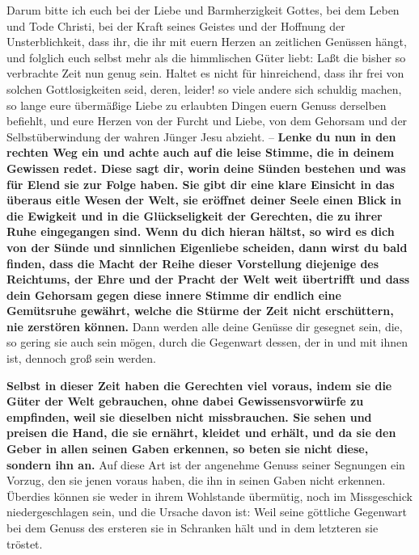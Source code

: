 \label{ref:04_23_innere_stimme}
Darum bitte ich euch bei der Liebe und Barmherzigkeit Gottes, bei dem Leben und
Tode Christi, bei der Kraft seines Geistes und der Hoffnung der Unsterblichkeit,
dass ihr, die ihr mit euern Herzen an zeitlichen Genüssen hängt, und folglich
euch selbst mehr als die himmlischen Güter liebt: Laßt die bisher so
verbrachte Zeit nun genug sein. Haltet es nicht für hinreichend, dass ihr frei
von solchen Gottlosigkeiten seid, deren, leider! so viele andere sich schuldig
machen, so lange eure übermäßige Liebe zu erlaubten Dingen euern Genuss
derselben
befiehlt, und eure Herzen von der Furcht und Liebe, von dem Gehorsam und der
Selbstüberwindung der wahren Jünger Jesu abzieht. -- \textbf{Lenke du nun in den
rechten Weg ein und achte auch auf die leise Stimme, die in deinem Gewissen
redet.
Diese sagt dir, worin deine Sünden bestehen und was für Elend sie zur Folge
haben. Sie gibt dir eine klare Einsicht in das überaus eitle Wesen der Welt,
sie eröffnet deiner Seele einen Blick in die Ewigkeit und in die Glückseligkeit
der Gerechten, die zu ihrer Ruhe eingegangen sind. Wenn du dich hieran hältst,
so wird es dich von der Sünde und sinnlichen Eigenliebe scheiden, dann wirst du
bald finden, dass die Macht der Reihe dieser Vorstellung diejenige des
Reichtums, der Ehre und der Pracht der Welt weit übertrifft und dass dein
Gehorsam gegen diese innere Stimme
dir endlich eine Gemütsruhe gewährt, welche
die Stürme der Zeit nicht erschüttern, nie zerstören können.} Dann werden alle
deine Genüsse dir gesegnet sein, die, so gering sie auch sein mögen, durch die
Gegenwart dessen, der in und mit ihnen ist, dennoch groß sein werden.
\label{ref:04_23_innere_stimme_ende}

\medskip

\label{ref:04_23_dinge_der_welt}
\textbf{Selbst in dieser Zeit haben die Gerechten viel voraus, indem sie die
Güter der
Welt gebrauchen, ohne dabei Gewissensvorwürfe zu empfinden, weil sie dieselben
nicht missbrauchen. Sie sehen und preisen die Hand, die sie ernährt, kleidet und
erhält, und da sie den Geber in allen seinen Gaben erkennen, so beten sie nicht
diese, sondern ihn an.} Auf diese Art ist der angenehme Genuss seiner Segnungen
ein Vorzug, den sie jenen voraus haben, die ihn in seinen Gaben nicht
erkennen. Überdies können sie weder in ihrem Wohlstande übermütig, noch im
Missgeschick niedergeschlagen sein, und die Ursache davon ist: Weil seine
göttliche Gegenwart bei dem Genuss des ersteren sie in Schranken hält und in
dem letzteren sie tröstet.

